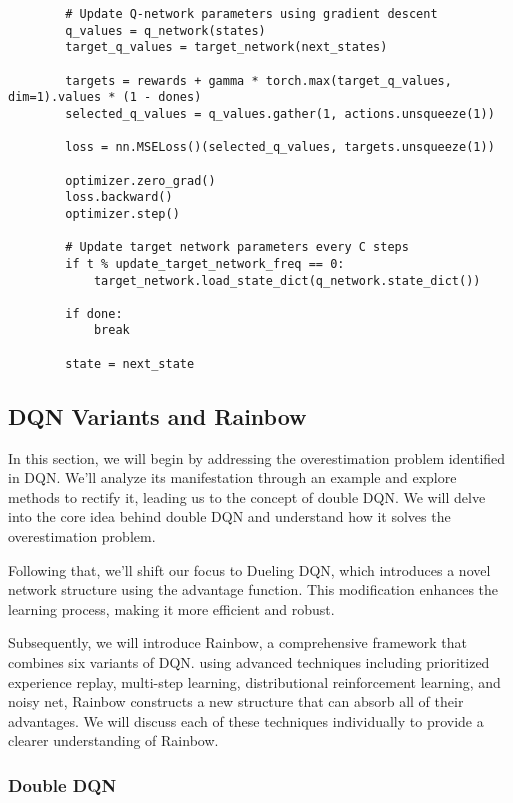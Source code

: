 \documentclass{article}
\begin{document}
\begin{lstlisting}
        # Update Q-network parameters using gradient descent
        q_values = q_network(states)
        target_q_values = target_network(next_states)

        targets = rewards + gamma * torch.max(target_q_values, dim=1).values * (1 - dones)
        selected_q_values = q_values.gather(1, actions.unsqueeze(1))

        loss = nn.MSELoss()(selected_q_values, targets.unsqueeze(1))

        optimizer.zero_grad()
        loss.backward()
        optimizer.step()

        # Update target network parameters every C steps
        if t % update_target_network_freq == 0:
            target_network.load_state_dict(q_network.state_dict())

        if done:
            break

        state = next_state

\end{lstlisting}


\newpage
\subsection{DQN Variants and Rainbow}

In this section, we will begin by addressing the overestimation problem identified in DQN. We'll analyze its manifestation through an example and explore methods to rectify it, leading us to the concept of double DQN. We will delve into the core idea behind double DQN and understand how it solves the overestimation problem.

Following that, we'll shift our focus to Dueling DQN, which introduces a novel network structure using the advantage function. This modification enhances the learning process, making it more efficient and robust.

Subsequently, we will introduce Rainbow, a comprehensive framework that combines six variants of DQN. using advanced techniques including prioritized experience replay, multi-step learning, distributional reinforcement learning, and noisy net, Rainbow constructs a new structure that can absorb all of their advantages. We will discuss each of these techniques individually to provide a clearer understanding of Rainbow.


\newpage
\subsubsection{Double DQN}
\end{document}
